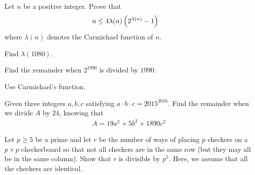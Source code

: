 
\begin{problem} %
	Let $n$ be a positive integer. Prove that
	\begin{align*}
		n
			& \le 4\lambda(n)\left(2^{\lambda(n)}-1\right)
	\end{align*}
	where $\lambda(n)$ denotes the Carmichael function of $n$.
\end{problem}

\begin{problem}
	Find $\lambda(1080)$.
\end{problem}

\begin{problem}[RMO 1990]%
	Find the remainder when $2^{1990}$ is divided by $1990$.
\end{problem}

\begin{hint}
	Use Carmichael's function.
\end{hint}

\begin{problem} %
	Given three integers $a,b,c$ satisfying $a\cdot b\cdot c=2015^{2016}$. Find the remainder when we divide $A$ by $24$, knowing that
	\begin{align*}
	A=19a^2+5b^2+1890c^2
	\end{align*}
\end{problem}

\begin{problem}[APMO 2006] %
	Let $p\ge5$ be a prime and let $r$ be the number of ways of placing $p$ checkers on a $p\times p$ checkerboard so that not all checkers are in the same row (but they may all be in the same column). Show that $r$ is divisible by $p^5$. Here, we assume that all the checkers are identical.
\end{problem}

